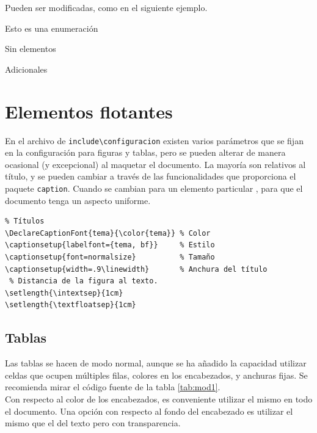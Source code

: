 Pueden ser modificadas, como en el siguiente ejemplo.

\begin{enumerate}[labelindent=\parindent ,leftmargin=*,label=\mbox{\bft{[Re \arabic*]}}]
\setcounter{enumi}{7}
\item Esto es una enumeración
\item Sin elementos
\item Adicionales
\end{enumerate}


\section{Elementos flotantes}

En el archivo de \verb+include\configuracion+ existen varios parámetros que se fijan en la configuración para figuras y tablas, pero se pueden alterar de manera ocasional (y excepcional) al maquetar el documento. La mayoría son relativos al título, y se pueden cambiar a través de las funcionalidades que proporciona el paquete \verb+caption+. Cuando se cambian para un elemento particular , para que el documento tenga un aspecto uniforme.

\begin{verbatim}
% Títulos
\DeclareCaptionFont{tema}{\color{tema}} % Color
\captionsetup{labelfont={tema, bf}}     % Estilo
\captionsetup{font=normalsize}          % Tamaño
\captionsetup{width=.9\linewidth}       % Anchura del título
 % Distancia de la figura al texto.
\setlength{\intextsep}{1cm} 
\setlength{\textfloatsep}{1cm}         
\end{verbatim}

\subsection{Tablas}
Las tablas se hacen de modo normal, aunque se ha añadido la capacidad utilizar celdas que ocupen múltiples filas, colores en los encabezados, y anchuras fijas. Se recomienda mirar el código fuente de la tabla \ref{tab:mod1}.\\

Con respecto al color de los encabezados, es conveniente utilizar el mismo en todo el documento. Una opción con respecto al fondo del encabezado es utilizar el mismo que el del texto pero con transparencia. \\



\newcommand{\bi}{\bfn{ES}/\bfr{EN}}
\newcommand{\esp}{\bfn{ES}}
\newcommand{\eng}{\bfr{EN}}

